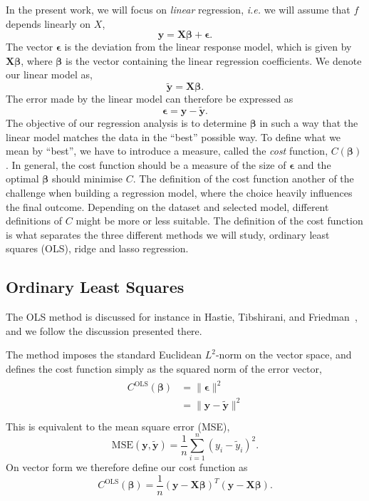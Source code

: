 \documentclass[a4paper, 
amsfonts, 
amssymb, 
amsmath, 
reprint, 
showkeys, 
nofootinbib, 
twoside]{revtex4-2}
\begin{document}
In the present work, we will focus on \textit{linear} regression, \textit{i.e.} we will assume that $f$ depends linearly on $X$, 
\begin{equation}
    \bm{y} = \bm{X}\bm{\beta} + \bm{\epsilon}.
    \label{eq:yXbe}
\end{equation}
The vector $\bm{\epsilon}$ is the deviation from the linear response model, which is given by $\bm{X}\bm{\beta}$, where $\bm{\beta}$ is the vector containing the linear regression coefficients. We denote our linear model as,
\begin{equation}
    \bm{\tilde{y} = \bm{X}\bm{\beta}}.
\end{equation} 
The error made by the linear model can therefore be expressed as
\begin{equation}
    \bm{\epsilon} = \bm{y} - \bm{\tilde{y}}.
\end{equation}
The objective of our regression analysis is to determine $\bm{\beta}$ in such a way that the linear model matches the data in the ``best'' possible way. To define what we mean by ``best'', we have to introduce a measure, called the \textit{cost} function, $C(\bm{\beta})$. In general, the cost function should be a measure of the size of $\bm{\epsilon}$ and the optimal $\bm{\beta}$ should minimise $C$. The definition of the cost function another of the challenge when building a regression model, where the choice heavily influences the final outcome. Depending on the dataset and selected model, different definitions of $C$ might be more or less suitable. The definition of the cost function is what separates the three different methods we will study, ordinary least squares (OLS), ridge and lasso regression.


\subsection{Ordinary Least Squares}

The OLS method is discussed for instance in Hastie, Tibshirani, and Friedman~\cite[Chapter 2]{Hastie}, and we follow the discussion presented there. 

The method imposes the standard Euclidean $L^2$-norm on the vector space, and defines the cost function simply as the squared norm of the error vector,
\begin{align}
\begin{split}
    C^\textrm{OLS}(\bm{\beta}) &= \lVert \bm{\epsilon} \rVert^2 \\
    &= \lVert \bm{y} - \bm{\tilde{y}} \rVert^2 \\
\end{split}
\end{align}
This is equivalent to the mean square error (MSE), 
\begin{equation}
    \textrm{MSE}(\bm{y}, \bm{\tilde{y}}) = \frac{1}{n}\sum_{i = 1}^n (y_i - \tilde{y}_i)^2.
\end{equation}
On vector form we therefore define our cost function as
\begin{equation}
    C^{\textrm{OLS}}(\bm{\beta}) = \frac{1}{n}(\bm{y} - \bm{X\beta})^T(\bm{y} - \bm{X\beta}).
\end{equation}
\end{document}
